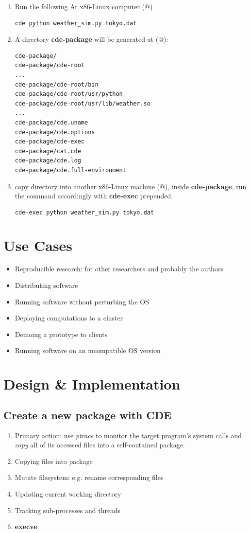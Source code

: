 \documentclass{report}
\makeatletter
\newcommand*{\rom}[1]{\expandafter\@slowromancap\romannumeral #1@}
\makeatother
\begin{document}
\begin{enumerate}
\item Run the following At x86-Linux computer (\rom{1})
\begin{verbatim}
cde python weather_sim.py tokyo.dat
\end{verbatim}
\item A directory \textbf{cde-package} will be generated at (\rom{1}):
\begin{verbatim}
cde-package/
cde-package/cde-root
...
cde-package/cde-root/bin
cde-package/cde-root/usr/python
cde-package/cde-root/usr/lib/weather.so
...
cde-package/cde.uname
cde-package/cde.options
cde-package/cde-exec
cde-package/cat.cde
cde-package/cde.log
cde-package/cde.full-environment
\end{verbatim}
\item copy directory into another x86-Linux machine (\rom{2}), inside
  \textbf{cde-package}, run the command accordingly with \textbf{cde-exec} prepended.
\begin{verbatim}
cde-exec python weather_sim.py tokyo.dat
\end{verbatim}
\end{enumerate}

\section{Use Cases}
\begin{itemize}
\item Reproducible research: for other researchers and probably the authors
\item Distributing software
\item Running software without perturbing the OS
\item Deploying computations to a cluster
\item Demoing a prototype to clients
\item Running software on an incompatible OS version
\end{itemize}

\section{Design \& Implementation}

\subsection{Create a new package with CDE}
\begin{enumerate}
\item Primary action: use \textsl{ptrace} to monitor the target program’s system calls and \textsl{copy} all of its accessed files into a self-contained package.
\item Copying files into package
\item Mutate filesystem: e.g. rename corresponding files
\item Updating current working directory
\item Tracking sub-processes and threads
\item \textbf{execve}
\end{enumerate}
\end{document}
